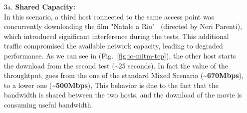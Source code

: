 \begin{enumerate}
            \item[3a.] \textbf{Shared Capacity:} \\
                In this scenario, a third host connected to the same access point was concurrently downloading the film "Natale a Rio"~\cite{Natale_a_Rio} (directed by Neri Parenti), which introduced significant interference during the tests. 
                This additional traffic compromised the available network capacity, leading to degraded performance.
                As we can see in (Fig.~\ref{fig:io-mitm-tcp}), the other host starts the download from the second test (\textasciitilde25 seconds). In fact the value of the throughtput, goes from the one of the standard Mixed Scenario (\textbf{\textasciitilde670Mbps}), to a lower one (\textbf{\textasciitilde500Mbps}),
                This behavior is due to the fact that the bandwidth is shared between the two hosts, and the download of the movie is consuming useful bandwidth.






\end{enumerate}
